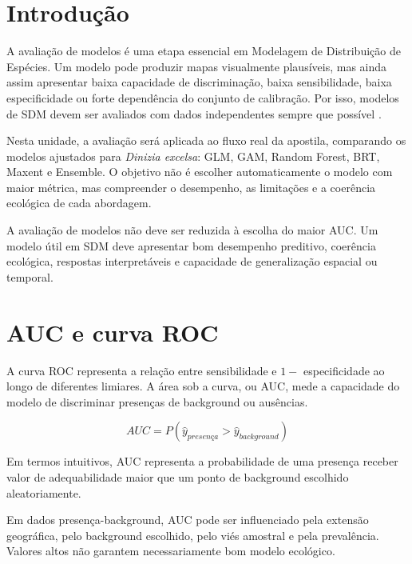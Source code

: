 \documentclass{ueap-sdm}
\begin{document}
\section{Introdução}

A avaliação de modelos é uma etapa essencial em Modelagem de Distribuição de Espécies. Um modelo pode produzir mapas visualmente plausíveis, mas ainda assim apresentar baixa capacidade de discriminação, baixa sensibilidade, baixa especificidade ou forte dependência do conjunto de calibração. Por isso, modelos de SDM devem ser avaliados com dados independentes sempre que possível \parencite{fielding1997review,allouche2006assessing,hirzel2006evaluating,li2013thresholds,guisan2017habitat}.

Nesta unidade, a avaliação será aplicada ao fluxo real da apostila, comparando os modelos ajustados para \textit{Dinizia excelsa}: GLM, GAM, Random Forest, BRT, Maxent e Ensemble. O objetivo não é escolher automaticamente o modelo com maior métrica, mas compreender o desempenho, as limitações e a coerência ecológica de cada abordagem.

\begin{conceito}[title={\faBook\quad Avaliação não é apenas ranqueamento}]
	A avaliação de modelos não deve ser reduzida à escolha do maior AUC. Um modelo útil em SDM deve apresentar bom desempenho preditivo, coerência ecológica, respostas interpretáveis e capacidade de generalização espacial ou temporal.
\end{conceito}

\section{AUC e curva ROC}

A curva ROC representa a relação entre sensibilidade e \(1 -\) especificidade ao longo de diferentes limiares. A área sob a curva, ou AUC, mede a capacidade do modelo de discriminar presenças de background ou ausências.

\begin{equationbox}
	\[
	AUC = P(\hat{y}_{presença} > \hat{y}_{background})
	\]
\end{equationbox}

Em termos intuitivos, AUC representa a probabilidade de uma presença receber valor de adequabilidade maior que um ponto de background escolhido aleatoriamente.

\begin{atencao}[title={\faExclamationTriangle\quad Limitações do AUC}]
	Em dados presença-background, AUC pode ser influenciado pela extensão geográfica, pelo background escolhido, pelo viés amostral e pela prevalência. Valores altos não garantem necessariamente bom modelo ecológico.
\end{atencao}
\end{document}
